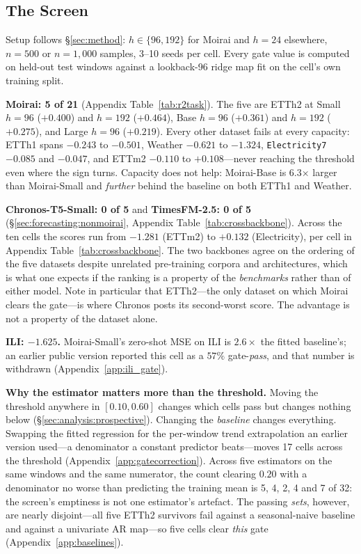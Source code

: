 \subsection{The Screen}
\label{sec:forecasting:gate}

Setup follows \S\ref{sec:method}: $h{\in}\{96,192\}$ for Moirai and $h{=}24$
elsewhere, $n{=}500$ or $n{=}1{,}000$ samples, 3--10 seeds per cell.  Every gate
value is computed on held-out test windows against a lookback-96 ridge map fit
on the cell's own training split.

\textbf{Moirai: 5 of 21} (Appendix Table~\ref{tab:r2task}).  The five are
ETTh2 at Small $h{=}96$ ($+0.400$) and $h{=}192$ ($+0.464$), Base $h{=}96$
($+0.361$) and $h{=}192$ ($+0.275$), and Large $h{=}96$ ($+0.219$).  Every
other dataset fails at every capacity: ETTh1 spans $-0.243$ to $-0.501$,
Weather $-0.621$ to $-1.324$, \texttt{Electricity7} $-0.085$ and $-0.047$, and
ETTm2 $-0.110$ to $+0.108$---never reaching the threshold even where the sign
turns.  Capacity does not help: Moirai-Base is 6.3$\times$ larger than
Moirai-Small and \emph{further} behind the baseline on both ETTh1 and Weather.

\textbf{Chronos-T5-Small: 0 of 5} and \textbf{TimesFM-2.5: 0 of 5}
(\S\ref{sec:forecasting:nonmoirai}, Appendix Table~\ref{tab:crossbackbone}).
Across the ten cells the scores run from $-1.281$ (ETTm2) to $+0.132$
(Electricity), per cell in Appendix Table~\ref{tab:crossbackbone}.
The two backbones agree on the ordering of the five datasets
despite unrelated pre-training corpora and architectures, which is what one
expects if the ranking is a property of the \emph{benchmarks} rather than of
either model.  Note in particular that ETTh2---the only dataset on which
Moirai clears the gate---is where Chronos posts its second-worst score.
The advantage is not a property of the dataset alone.

\textbf{ILI: $-1.625$.}  Moirai-Small's zero-shot MSE on ILI is $2.6\times$ the
fitted baseline's; an earlier public version reported this cell as a $57\%$
gate-\emph{pass}, and that number is withdrawn (Appendix~\ref{app:ili_gate}).

\textbf{Why the estimator matters more than the threshold.}
Moving the threshold anywhere in $[0.10,0.60]$ changes which cells pass but
changes nothing below (\S\ref{sec:analysis:prospective}).  Changing the
\emph{baseline} changes everything.  Swapping the fitted regression for the
per-window trend extrapolation an earlier version used---a denominator a
constant predictor beats---moves 17 cells across the threshold
(Appendix~\ref{app:gatecorrection}).  Across five estimators on the same
windows and the same numerator, the count clearing $0.20$ with a denominator no
worse than predicting the training mean is 5, 4, 2, 4 and 7 of 32: the screen's
emptiness is not one estimator's artefact.  The passing \emph{sets}, however,
are nearly disjoint---all five ETTh2 survivors fail against a seasonal-naive
baseline and against a univariate AR map---so five cells clear \emph{this} gate
(Appendix~\ref{app:baselines}).

